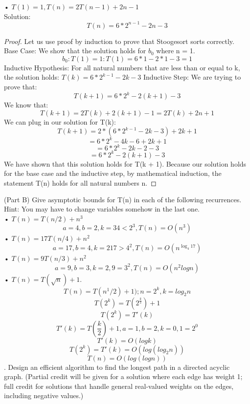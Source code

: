 \documentclass[11pt, solution, letterpaper]{format}
\begin{document}
• $T(1) = 1,T(n) = 2T(n - 1) +2n - 1$\\
Solution: $$T(n) = 6*2^{n-1} -2n - 3 $$
\begin{proof}
Let us use proof by induction to prove that Stoogesort sorts correctly. 
Base Case: We show that the solution holds for $b_0$ where n = 1. $$b_0: T(1) = 1: T(1) = 6*1 - 2*1 - 3 = 1 $$ 
Inductive Hypothesis: For all natural numbers that are less than or equal to k, the solution holds:
$T(k) = 6*2^{k-1} -2k - 3  $
Inductive Step: We are trying to prove that:
$$T(k + 1) = 6*2^k - 2(k + 1) - 3 $$
We know that:
$$T(k + 1) = 2T(k) + 2(k + 1) - 1 = 2T(k) + 2n + 1 $$
We can plug in our solution for T(k):
$$T(k + 1) = 2*(6 * 2^{k-1} - 2k - 3) + 2k + 1$$
$$ = 6*2^k - 4k - 6 + 2k + 1$$
$$ = 6*2^k - 2k - 2 - 3 $$
$$ = 6*2^k - 2(k + 1) - 3 $$
We have shown that this solution holds for T(k + 1). Because our solution holds for the base case and the inductive step, by mathematical induction, the statement T(n) holds for all natural numbers n.
\end{proof}

(Part B) Give asymptotic bounds for T(n) in each of the following recurrences. Hint: You may have to change
variables somehow in the last one.\\
• $T(n) = T(n/2) +n^3$ \\
$$a = 4, b = 2, k = 3  4 < 2^3, T(n) = O(n^3)$$
• $T(n) = 17T(n/4) +n^2$ \\
$$a = 17, b = 4, k = 2  17 > 4^2, T(n) = O(n^{\log_4{17}})$$ 
• $T(n) = 9T(n/3) +n^2$\\
$$a = 9, b = 3, k = 2,  9 = 3^2, T(n) = O(n^2logn)$$ 
• $T(n) = T(\sqrt{n}) +1. $\\
$$T(n) = T(n^1/2) + 1) ; n = 2^k, k = log_2{n}$$
$$T(2^k) = T(2^{\frac{k}{2}}) + 1 $$
$$T(2^k) = T'(k)$$
$$T'(k) = T(\frac{k}{2}) + 1, a = 1, b = 2, k = 0, 1 = 2^0$$
$$T'(k) = O(logk)$$
$$T(2^k) = T'(k) = O(log(log_2{n}))$$
$$T(n) = O(log(logn))$$
. Design an efficient algorithm to find the longest path in a directed acyclic graph. (Partial credit will be given
for a solution where each edge has weight 1; full credit for solutions that handle general real-valued weights
on the edges, including negative values.)\\
\end{document}
